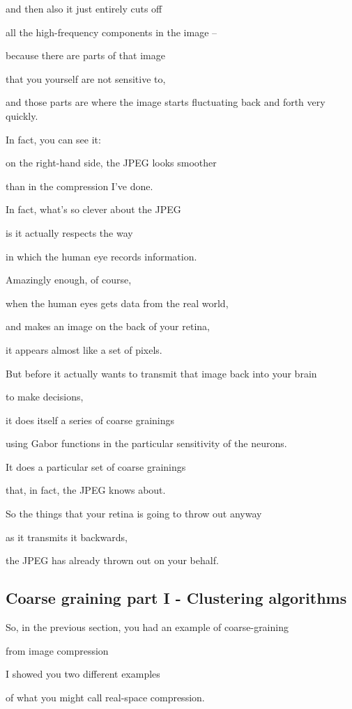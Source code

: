 \documentclass[]{article}
\begin{document}
and then also it just entirely cuts off

all the high-frequency components
in the image –

because there are parts of that image

that you yourself are not sensitive to,

and those parts are where the image starts
fluctuating back and forth very quickly.

In fact, you can see it:

on the right-hand side,
the JPEG looks smoother

than in the compression I've done.

In fact, what's so clever about the JPEG

is it actually respects the way

in which the human eye
records information.

Amazingly enough, of course,

when the human eyes
gets data from the real world,

and makes an image
on the back of your retina,

it appears almost like a set of pixels.

But before it actually wants to transmit
that image back into your brain

to make decisions,

it does itself
a series of coarse grainings

using Gabor functions in the particular
sensitivity of the neurons.

It does a particular set
of coarse grainings

that, in fact, the JPEG knows about.

So the things that your retina
is going to throw out anyway

as it transmits it backwards,

the JPEG has already thrown out
on your behalf.
\subsection{Coarse graining part I - Clustering algorithms}

So, in the previous section,
you had an example of coarse-graining

from image compression

I showed you two different examples

of what you might call
real-space compression.
\end{document}
